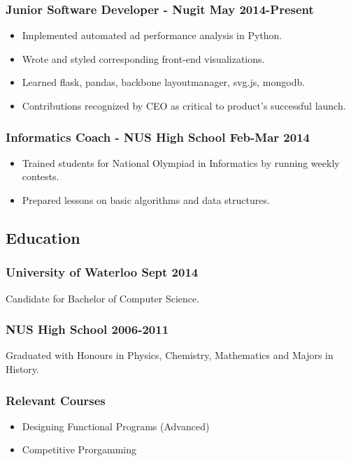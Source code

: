 \documentclass[letterpaper]{article}
\begin{document}
\subsubsection*{Junior Software Developer - Nugit \hfill May 2014-Present}
\begin{itemize}
\setlength\itemsep{0em}
\item Implemented automated ad performance analysis in Python.
\item Wrote and styled corresponding front-end visualizations.
\item Learned flask, pandas, backbone layoutmanager, svg.js, mongodb.
\item Contributions recognized by CEO as critical to product's successful launch.
\end{itemize}

\subsubsection*{Informatics Coach - NUS High School \hfill Feb-Mar 2014}
\begin{itemize}
\setlength\itemsep{0em}
\item Trained students for National Olympiad in Informatics by running weekly contests.
\item Prepared lessons on basic algorithms and data structures.
\end{itemize}

\vspace{1em}

\begin{center}
\section*{Education}
\end{center}

\subsubsection*{University of Waterloo \hfill Sept 2014}
Candidate for Bachelor of Computer Science.

\subsubsection*{NUS High School \hfill 2006-2011}
Graduated with Honours in Physics, Chemistry, Mathematics and Majors in History.

\subsubsection*{Relevant Courses}
\begin{itemize}
\setlength\itemsep{0em}
\item Designing Functional Programs (Advanced)
\item Competitive Prorgamming
\end{itemize}
\end{document}
